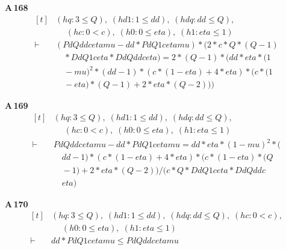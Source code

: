 \noindent\textbf{A\,168}\quad{}
{\footnotesize\[ \begin{aligned}[t]
&(\mathit{hq} : 3 \leq \mathit{Q}),\; (\mathit{hd1} : 1 \leq \mathit{dd}),\; (\mathit{hdq} : \mathit{dd} \leq \mathit{Q}),\\
&\quad \; (\mathit{hc} : 0 < \mathit{c}),\; (\mathit{h0} : 0 \leq \mathit{eta}),\; (\mathit{h1} : \mathit{eta} \leq 1)\\
\vdash\;&(\mathit{Pd} \mathit{Q} \mathit{dd} \mathit{c} \mathit{eta} \mathit{mu} - \mathit{dd} * \mathit{Pd} \mathit{Q} 1 \mathit{c} \mathit{eta} \mathit{mu}) * (2 * \mathit{c} * \mathit{Q} * (\mathit{Q} - 1)\\
&\quad * \mathit{Dd} \mathit{Q} 1 \mathit{c} \mathit{eta} * \mathit{Dd} \mathit{Q} \mathit{dd} \mathit{c} \mathit{eta}) = 2 * (\mathit{Q} - 1) * (\mathit{dd} * \mathit{eta} * (1\\
&\quad - \mathit{mu}) ^{2} * (\mathit{dd} - 1) * (\mathit{c} * (1 - \mathit{eta}) + 4 * \mathit{eta}) * (\mathit{c} * (1\\
&\quad - \mathit{eta}) * (\mathit{Q} - 1) + 2 * \mathit{eta} * (\mathit{Q} - 2)))
\end{aligned} \]}

\noindent\textbf{A\,169}\quad{}
{\footnotesize\[ \begin{aligned}[t]
&(\mathit{hq} : 3 \leq \mathit{Q}),\; (\mathit{hd1} : 1 \leq \mathit{dd}),\; (\mathit{hdq} : \mathit{dd} \leq \mathit{Q}),\\
&\quad \; (\mathit{hc} : 0 < \mathit{c}),\; (\mathit{h0} : 0 \leq \mathit{eta}),\; (\mathit{h1} : \mathit{eta} \leq 1)\\
\vdash\;&\mathit{Pd} \mathit{Q} \mathit{dd} \mathit{c} \mathit{eta} \mathit{mu} - \mathit{dd} * \mathit{Pd} \mathit{Q} 1 \mathit{c} \mathit{eta} \mathit{mu} = \mathit{dd} * \mathit{eta} * (1 - \mathit{mu}) ^{2} * (\\
&\quad \mathit{dd} - 1) * (\mathit{c} * (1 - \mathit{eta}) + 4 * \mathit{eta}) * (\mathit{c} * (1 - \mathit{eta}) * (\mathit{Q}\\
&\quad - 1) + 2 * \mathit{eta} * (\mathit{Q} - 2)) / (\mathit{c} * \mathit{Q} * \mathit{Dd} \mathit{Q} 1 \mathit{c} \mathit{eta} * \mathit{Dd} \mathit{Q} \mathit{dd} \mathit{c}\\
&\quad \mathit{eta})
\end{aligned} \]}

\noindent\textbf{A\,170}\quad{}
{\footnotesize\[ \begin{aligned}[t]
&(\mathit{hq} : 3 \leq \mathit{Q}),\; (\mathit{hd1} : 1 \leq \mathit{dd}),\; (\mathit{hdq} : \mathit{dd} \leq \mathit{Q}),\; (\mathit{hc} : 0 < \mathit{c}),\\
&\quad \; (\mathit{h0} : 0 \leq \mathit{eta}),\; (\mathit{h1} : \mathit{eta} \leq 1)\\
\vdash\;&\mathit{dd} * \mathit{Pd} \mathit{Q} 1 \mathit{c} \mathit{eta} \mathit{mu} \leq \mathit{Pd} \mathit{Q} \mathit{dd} \mathit{c} \mathit{eta} \mathit{mu}
\end{aligned} \]}

